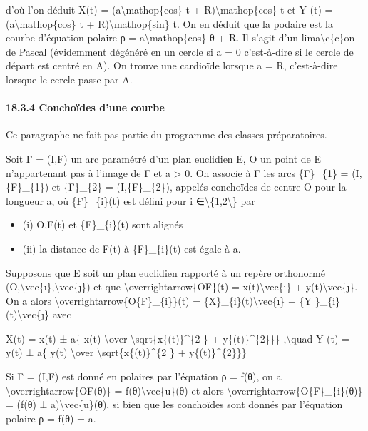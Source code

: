\documentclass[]{article}
\begin{document}
d'où l'on déduit X(t) = (a\textbackslash{}mathop\{cos\} t +
R)\textbackslash{}mathop\{cos\} t et Y (t) =
(a\textbackslash{}mathop\{cos\} t + R)\textbackslash{}mathop\{sin\} t.
On en déduit que la podaire est la courbe d'équation polaire ρ =
a\textbackslash{}mathop\{cos\} θ + R. Il s'agit d'un
lima\textbackslash{}c\{c\}on de Pascal (évidemment dégénéré en un cercle
si a = 0 c'est-à-dire si le cercle de départ est centré en A). On trouve
une cardioïde lorsque a = R, c'est-à-dire lorsque le cercle passe par A.

\paragraph{18.3.4 Conchoïdes d'une courbe}

Ce paragraphe ne fait pas partie du programme des classes préparatoires.

Soit Γ = (I,F) un arc paramétré d'un plan euclidien E, O un point de E
n'appartenant pas à l'image de Γ et a \textgreater{} 0. On associe à Γ
les arcs \{Γ\}\_\{1\} = (I,\{F\}\_\{1\}) et \{Γ\}\_\{2\} =
(I,\{F\}\_\{2\}), appelés conchoïdes de centre O pour la longueur a, où
\{F\}\_\{i\}(t) est défini pour i
∈\textbackslash{}\{1,2\textbackslash{}\} par

\begin{itemize}
\itemsep1pt\parskip0pt
\item
  (i) O,F(t) et \{F\}\_\{i\}(t) sont alignés
\item
  (ii) la distance de F(t) à \{F\}\_\{i\}(t) est égale à a.
\end{itemize}

Supposons que E soit un plan euclidien rapporté à un repère orthonormé
(O,\textbackslash{}vec\{ı\},\textbackslash{}vec\{ȷ\}) et que
\textbackslash{}overrightarrow\{OF\}(t) = x(t)\textbackslash{}vec\{ı\} +
y(t)\textbackslash{}vec\{ȷ\}. On a alors
\textbackslash{}overrightarrow\{O\{F\}\_\{i\}\}(t) =
\{X\}\_\{i\}(t)\textbackslash{}vec\{ı\} + \{Y
\}\_\{i\}(t)\textbackslash{}vec\{ȷ\} avec

X(t) = x(t) ± a\{ x(t) \textbackslash{}over
\textbackslash{}sqrt\{x\{(t)\}\^{}\{2 \} + y\{(t)\}\^{}\{2\}\}\}
,\textbackslash{}quad Y (t) = y(t) ± a\{ y(t) \textbackslash{}over
\textbackslash{}sqrt\{x\{(t)\}\^{}\{2 \} + y\{(t)\}\^{}\{2\}\}\}

Si Γ = (I,F) est donné en polaires par l'équation ρ = f(θ), on a
\textbackslash{}overrightarrow\{OF(θ)\} =
f(θ)\textbackslash{}vec\{u\}(θ) et alors
\textbackslash{}overrightarrow\{O\{F\}\_\{i\}(θ)\} = (f(θ) ±
a)\textbackslash{}vec\{u\}(θ), si bien que les conchoïdes sont donnés
par l'équation polaire ρ = f(θ) ± a.
\end{document}
